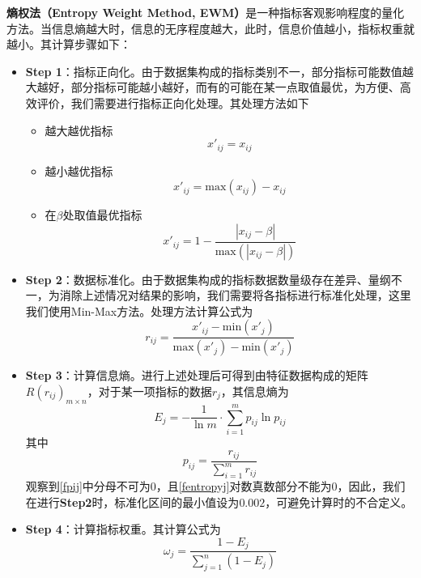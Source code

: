 \documentclass{MathorCupModeling}
\begin{document}
	\textbf{熵权法（Entropy Weight Method, EWM）}是一种指标客观影响程度的量化方法。当信息熵越大时，信息的无序程度越大，此时，信息价值越小，指标权重就越小\textcolor{blue}{\cite{Paper:EWMO}}。其计算步骤如下：
	\begin{itemize}
		\item \textbf{Step 1}：指标正向化。由于数据集构成的指标类别不一，部分指标可能数值越大越好，部分指标可能越小越好，而有的可能在某一点取值最优，为方便、高效评价，我们需要进行指标正向化处理\textcolor{blue}{\cite{Paper:EWMT}}。其处理方法如下
		\begin{itemize}
			\item {\heiti 越大越优指标}
			\begin{equation}
				x'_{ij}=x_{ij} \label{fmax}
			\end{equation}
			\item {\heiti 越小越优指标}
			\begin{equation}
				x'_{ij}=\mathrm{max}\left(x_{ij}\right)-x_{ij} \label{fmin}
			\end{equation}
			\item {\heiti 在$\beta$处取值最优指标}
			\begin{equation}
				x'_{ij}=1-\frac{\left|x_{ij}-\beta\right|}{\mathrm{max}\left(\left|x_{ij}-\beta\right|\right)} \label{fmid}
			\end{equation}
		\end{itemize}
		\item \textbf{Step 2}：数据标准化。由于数据集构成的指标数据数量级存在差异、量纲不一，为消除上述情况对结果的影响，我们需要将各指标进行标准化处理，这里我们使用Min-Max方法。处理方法计算公式为
		\begin{equation}
			r_{ij}=\frac{x'_{ij}-\mathrm{min}\left(x'_{j}\right)}{\mathrm{max}\left(x'_{j}\right)-\mathrm{min}\left(x'_{j}\right)} \label{Min-Max}
		\end{equation}
		\item \textbf{Step 3}：计算信息熵。进行上述处理后可得到由特征数据构成的矩阵$R\left(r_{ij}\right)_{m\times n}$，对于某一项指标的数据$r_j$，其信息熵为
		\begin{equation}
			E_j=-\frac{1}{\ln m}\cdot\sum\limits_{i=1}^{m}p_{ij}\ln p_{ij} \label{fentropyj}
		\end{equation}
		其中
		\begin{equation}
			p_{ij}=\frac{r_{ij}}{\sum\limits_{i=1}^{m}r_{ij}} \label{fpij}
		\end{equation}
		观察到\textcolor{blue}{\eqref{fpij}}中分母不可为$0$，且\textcolor{blue}{\eqref{fentropyj}}对数真数部分不能为$0$，因此，我们在进行\textbf{Step2}时，标准化区间的最小值设为$0.002$，可避免计算时的不合定义。
		\item \textbf{Step 4}：计算指标权重。其计算公式为
		\begin{equation}
			\omega_j=\frac{1-E_j}{\sum\limits_{j=1}^{n}\left(1-E_j\right)} \label{fwj}
		\end{equation}
	\end{itemize}
\end{document}
